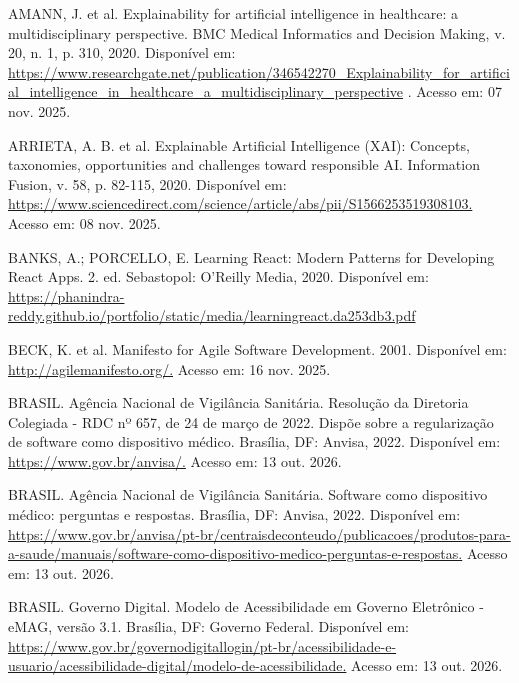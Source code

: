 \begin{SingleSpace}
{\raggedright\setlength{\parindent}{0pt} AMANN, J. et al. Explainability for artificial intelligence in healthcare: a multidisciplinary perspective. BMC Medical Informatics and Decision Making, v. 20, n. 1, p. 310, 2020. Disponível em: \url{https://www.researchgate.net/publication/346542270_Explainability_for_artificial_intelligence_in_healthcare_a_multidisciplinary_perspective} . Acesso em: 07 nov. 2025.\par}\smallskip

{\raggedright\setlength{\parindent}{0pt} ARRIETA, A. B. et al. Explainable Artificial Intelligence (XAI): Concepts, taxonomies, opportunities and challenges toward responsible AI. Information Fusion, v. 58, p. 82-115, 2020. Disponível em: \url{https://www.sciencedirect.com/science/article/abs/pii/S1566253519308103.} Acesso em: 08 nov. 2025.\par}\smallskip

{\raggedright\setlength{\parindent}{0pt} BANKS, A.; PORCELLO, E. Learning React: Modern Patterns for Developing React Apps. 2. ed. Sebastopol: O'Reilly Media, 2020. Disponível em: \url{https://phanindra-reddy.github.io/portfolio/static/media/learningreact.da253db3.pdf}\par}\smallskip

{\raggedright\setlength{\parindent}{0pt} BECK, K. et al. Manifesto for Agile Software Development. 2001. Disponível em: \url{http://agilemanifesto.org/.} Acesso em: 16 nov. 2025.\par}\smallskip

{\raggedright\setlength{\parindent}{0pt} BRASIL. Agência Nacional de Vigilância Sanitária. Resolução da Diretoria Colegiada - RDC nº 657, de 24 de março de 2022. Dispõe sobre a regularização de software como dispositivo médico. Brasília, DF: Anvisa, 2022. Disponível em: \url{https://www.gov.br/anvisa/.} Acesso em: 13 out. 2026.\par}\smallskip

{\raggedright\setlength{\parindent}{0pt} BRASIL. Agência Nacional de Vigilância Sanitária. Software como dispositivo médico: perguntas e respostas. Brasília, DF: Anvisa, 2022. Disponível em: \url{https://www.gov.br/anvisa/pt-br/centraisdeconteudo/publicacoes/produtos-para-a-saude/manuais/software-como-dispositivo-medico-perguntas-e-respostas.} Acesso em: 13 out. 2026.\par}\smallskip

{\raggedright\setlength{\parindent}{0pt} BRASIL. Governo Digital. Modelo de Acessibilidade em Governo Eletrônico - eMAG, versão 3.1. Brasília, DF: Governo Federal. Disponível em: \url{https://www.gov.br/governodigitallogin/pt-br/acessibilidade-e-usuario/acessibilidade-digital/modelo-de-acessibilidade.} Acesso em: 13 out. 2026.\par}\smallskip


\end{SingleSpace}

